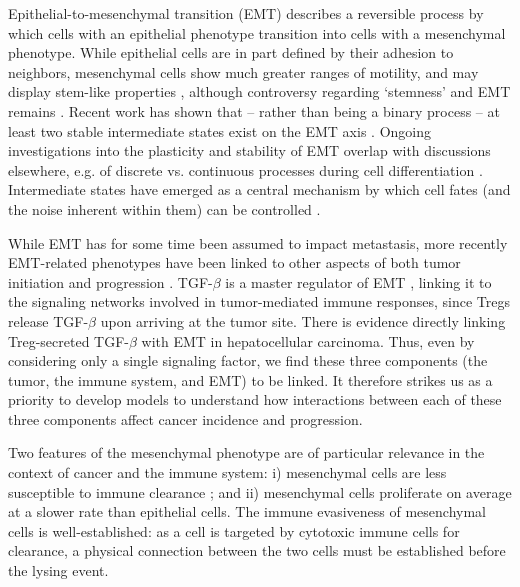\documentclass[11pt]{article}
\begin{document}
\par
Epithelial-to-mesenchymal transition (EMT) describes a reversible process by which cells with an epithelial phenotype transition into cells with a mesenchymal phenotype.
While epithelial cells are in part defined by their adhesion to neighbors, mesenchymal cells show much greater ranges of motility, and may display stem-like properties \cite{nieto2016emt}, although controversy regarding `stemness' and EMT remains \cite{nie18_stem, sha19_intermediate}.  
Recent work has shown that -- rather than being a binary process -- at least two stable intermediate states exist on the EMT axis \cite{hong2015ovol2, jolly15_coupling}.
Ongoing investigations into the plasticity and stability of EMT overlap with discussions elsewhere, e.g. of discrete vs. continuous processes during cell differentiation \cite{moris16_transition}.
Intermediate states have emerged as a central mechanism by which cell fates (and the noise inherent within them) can be controlled \cite{maclean18_exploring, ta16_controlling, rackauckas18_meanindependent}. 
\par 
While EMT has for some time been assumed to impact metastasis, more recently EMT-related phenotypes have been linked to other aspects of both tumor initiation \cite{puisieux2014oncogenic} and progression \cite{nieto2016emt,peinado2007snail}.
TGF-$\beta$ is a master regulator of EMT \cite{lim2012epithelial}, linking it to the signaling networks involved in tumor-mediated immune responses, since Tregs release TGF-$\beta$ upon arriving at the tumor site\cite{terry2017new}. 
There is evidence directly linking Treg-secreted TGF-$\beta$ with EMT in hepatocellular carcinoma\cite{shi2019cd4+}.
Thus, even by considering only a single signaling factor, we find these three components (the tumor, the immune system, and EMT) to be linked. It therefore strikes us as a priority to develop models to understand how interactions between each of these three components affect cancer incidence and progression.
\par
Two features of the mesenchymal phenotype are of particular relevance in the context of cancer and the immune system: i) mesenchymal cells are less susceptible to immune clearance \cite{terry2017new}; and ii) mesenchymal cells proliferate on average at a slower rate than epithelial cells.
The immune evasiveness of mesenchymal cells is well-established: as a cell is targeted by cytotoxic immune cells for clearance, a physical connection between the two cells must be established before the lysing event.
\end{document}
